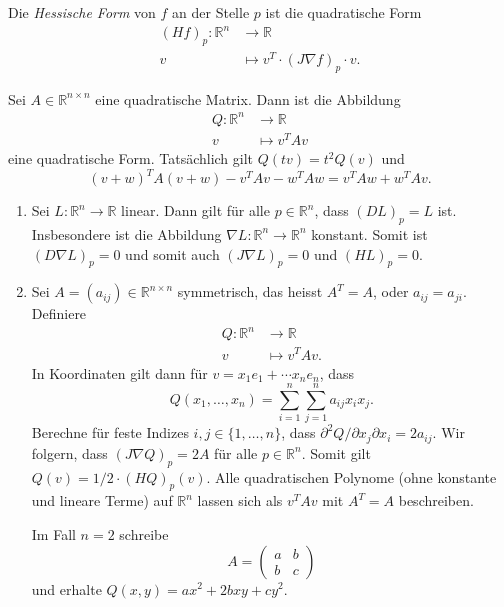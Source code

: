\documentclass[../main.tex]{subfiles}
\begin{document}
\begin{definition}
  Die \emph{Hessische Form} von $f$ an der Stelle $p$
  ist die quadratische Form
  \begin{align*}
    {(Hf)}_p \colon \mathbb{R}^n & \to \mathbb{R} \\
    v & \mapsto v^T \cdot {(J \nabla f)}_p \cdot v.
  \end{align*}
\end{definition}

\begin{remark}
  Sei $A \in \mathbb{R}^{n \times n}$ eine quadratische Matrix.
  Dann ist die Abbildung
  \begin{align*}
    Q \colon \mathbb{R}^n & \to \mathbb{R} \\
    v & \mapsto v^T A v
  \end{align*}
  eine quadratische Form.
  Tatsächlich gilt $Q(tv) = t^2 Q(v)$ und
  \[
    (v + w)^T A (v + w) - v^T A v - w^T A w
    = v^T A w + w^T A v.
  \]
\end{remark}

\begin{examples}
  \leavevmode
  \begin{enumerate}[(1)]
    \item Sei $L \colon \mathbb{R}^n \to \mathbb{R}$ linear.
      Dann gilt für alle $p \in \mathbb{R}^n$, dass
      ${(DL)}_p = L$ ist.
      Insbesondere ist die Abbildung
      $\nabla L \colon \mathbb{R}^n \to \mathbb{R}^n$
      konstant.
      Somit ist ${(D \nabla L )}_p = 0$ und somit auch
      ${(J \nabla L )}_p = 0$ und ${(HL)}_p = 0$.
    \item Sei $A = (a_{ij}) \in\mathbb{R}^{n \times n}$ symmetrisch,
      das heisst $A^T = A$, oder $a_{ij} = a_{ji}$.
      Definiere
      \begin{align*}
        Q \colon \mathbb{R}^n & \to \mathbb{R} \\
        v & \mapsto v^T A v.
      \end{align*}
      In Koordinaten gilt dann für $v = x_1 e_1 + \cdots x_n e_n$, dass
      \[
        Q(x_1, \dots, x_n) = \sum_{i=1}^{n} \sum_{j=1}^{n} a_{ij} x_i x_j.
      \]
      Berechne für feste Indizes $i, j \in \{1, \dots, n\}$, dass
      \(
        {\partial^2 Q}/{\partial x_j \partial x_i} = 2a_{ij}
      \).
      Wir folgern, dass ${(J \nabla Q)}_p = 2A$ für alle $p \in \mathbb{R}^n$.
      Somit gilt $Q(v) = 1/2 \cdot {(HQ)}_p(v)$.
      Alle quadratischen Polynome (ohne konstante und lineare Terme)
      auf $\mathbb{R}^n$ lassen sich als
      $v^T A v$ mit $A^T = A$ beschreiben.

      Im Fall $n = 2$ schreibe
      \[
        A =
        \begin{pmatrix}
          a & b \\ b & c
        \end{pmatrix}
      \]
      und erhalte
      \(
        Q(x, y) = ax^2 + 2bxy + cy^2
      \).
  \end{enumerate}
\end{examples}
\end{document}
